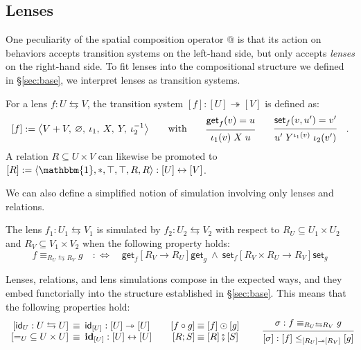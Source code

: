 \documentclass[acmsmall,screen,review,anonymous]{acmart}
\newcommand{\kw}[1]{\ensuremath{ \mathsf{#1} }}
\newcommand{\ifr}[1]{\mathrel{[{#1}]}}
\newcommand{\lensarrow}{\leftrightarrows}
\newcommand{\lensle}{\equiv}
\newcommand{\idsc}{\mathbf{id}} %
\newcommand{\vcomp}{\fatsemi}
\begin{document}
\subsection{Lenses} %

One peculiarity of the spatial composition operator $\mathbin@$
is that its action on behaviors
accepts transition systems on the left-hand side, but
only accepts \emph{lenses} on the right-hand side.
To fit lenses into the compositional structure
we defined in \S\ref{sec:base},
we interpret lenses as transition systems.

\begin{definition}
For a lens $f : U \lensarrow V$,
the transition system $[f] : [U] \twoheadrightarrow [V]$
is defined as:
\[
  [f] := \big\langle
    V + V, \: \varnothing, \:
    \iota_1, \: X, \: Y, \: \iota_2^{-1}
  \big\rangle
  \qquad \text{with} \qquad
  \begin{prooftree}
    \hypo{\kw{get}_f(v) = u}
    \infer1{\iota_1(v) \mathrel{X} u}
  \end{prooftree}
  \qquad
  \begin{prooftree}
    \hypo{\kw{set}_f(v, u') = v'}
    \infer1{u' \mathrel{Y^{\iota_1(v)}} \iota_2(v')}
  \end{prooftree}
  \quad.
\]
A relation $R \subseteq U \times V$
can likewise be promoted to
$[R] := \langle \mathbbm{1}, *, \top, \top, R, R \rangle :
 [U] \leftrightarrow [V]$.
\end{definition}

We can also define a simplified notion of simulation
involving only lenses and relations.

\begin{definition}
The lens
$f_1 : U_1 \lensarrow V_1$
is simulated by
$f_2 : U_2 \lensarrow V_2$
with respect to
$R_U \subseteq U_1 \times U_2$ and 
$R_V \subseteq V_1 \times V_2$
when the following property holds: 
\[
  f \lensle_{R_U \lensarrow R_V} g
  \quad :\Leftrightarrow \quad
  \kw{get}_f \ifr{R_V \rightarrow R_U} \kw{get}_g
  \:\wedge\:
  \kw{set}_f \ifr{R_V \times R_U \rightarrow R_V} \kw{set}_g
\]
\end{definition}

Lenses, relations, and lens simulations
compose in the expected ways,
and they embed functorially into
the structure established in \S\ref{sec:base}.
This means that the following properties hold:
\[
\begin{array}{r@{\:}l@{\qquad}r@{\:}l}
  [\kw{id}_U : U \lensarrow U]
    &\:\equiv\: \kw{id}_{[U]} : [U] \twoheadrightarrow [U]
  &
  [f \circ g] &\equiv [f] \odot [g]
  \\
  {[{=}_U \subseteq U \times U]}
    &\:\equiv\: \idsc_{[U]} : [U] \leftrightarrow [U]
  &
  [R ; S] &\equiv [R] \vcomp [S]
\end{array}
\qquad
\begin{prooftree}
  \hypo{\sigma : f \equiv_{R_U \lensarrow R_V} g}
  \infer1{[\sigma] : [f] \le_{[R_U] \twoheadrightarrow [R_V]} [g]}
\end{prooftree}
\]
\end{document}

